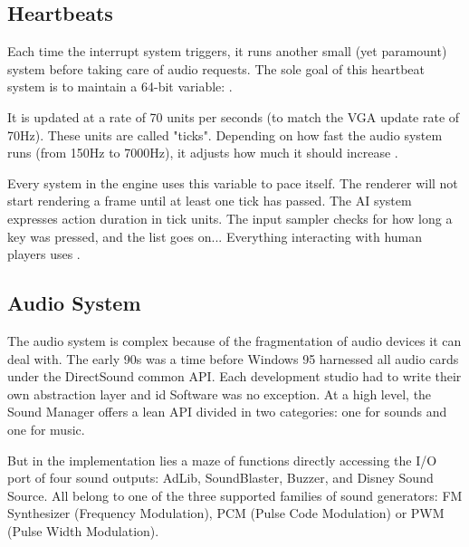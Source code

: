 \subsection{Heartbeats}
Each time the interrupt system triggers, it runs another small (yet paramount) system before taking care of audio requests. The sole goal of this heartbeat system is to maintain a 64-bit variable: .\\
\par
\begin{minipage}{\textwidth}

\end{minipage}
\par
It is updated at a rate of 70 units per seconds (to match the VGA update rate of 70Hz). These units are called "ticks". Depending on how fast the audio system runs (from 150Hz to 7000Hz), it adjusts how much it should increase .\\
\par
Every system in the engine uses this variable to pace itself. The renderer will not start rendering a frame until at least one tick has passed. The AI system expresses action duration in tick units. The input sampler checks for how long a key was pressed, and the list goes on... Everything interacting with human players uses .\\













\subsection{Audio System}
The audio system is complex because of the fragmentation of audio devices it can deal with. The early 90s was a time before Windows 95 harnessed all audio cards under the DirectSound common API. Each development studio had to write their own abstraction layer and id Software was no exception. At a high level, the Sound Manager offers a lean API divided in two categories: one for sounds and one for music.\\
\par
\begin{minipage}{\textwidth}

\end{minipage}
\par
\begin{minipage}{\textwidth}

\end{minipage}
\par
\vspace{10pt}
But in the implementation lies a maze of functions directly accessing the I/O port of four sound outputs: AdLib, SoundBlaster, Buzzer, and Disney Sound Source. All belong to one of the three supported families of sound generators: FM Synthesizer (Frequency Modulation), PCM (Pulse Code Modulation) or PWM (Pulse Width Modulation).\\


